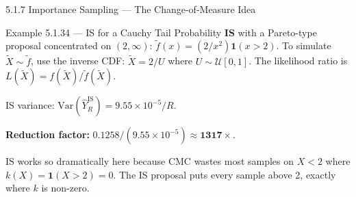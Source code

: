 \documentclass[aspectratio=169,10pt]{beamer}
\begin{document}
\begin{frame}[allowframebreaks]{5.1.7 Importance Sampling --- The Change-of-Measure Idea}
\begin{exampleblock}{Example 5.1.34 --- IS for a Cauchy Tail Probability}
  \medskip
  \textbf{IS} with a Pareto-type proposal concentrated on $(2,\infty)$:
  $\tilde{f}(x) = (2/x^2)\mathbf{1}(x>2)$.
  To simulate $\tilde{X} \sim \tilde{f}$, use the inverse CDF: $\tilde{X} = 2/U$
  where $U \sim \mathcal{U}[0,1]$.  The likelihood ratio is
  $L(\tilde{X}) = f(\tilde{X})/\tilde{f}(\tilde{X})$.

  \medskip
  IS variance: $\mathrm{Var}(\hat{Y}^{\mathrm{IS}}_R) = 9.55\times10^{-5}/R$.

  \medskip
  \textbf{Reduction factor:} $0.1258 / (9.55\times10^{-5}) \approx \mathbf{1317}\times$.

  \medskip
  IS works so dramatically here because CMC wastes most samples on $X < 2$
  where $k(X) = \mathbf{1}(X>2) = 0$.  The IS proposal puts every sample
  above 2, exactly where $k$ is non-zero.
\end{exampleblock}

\end{frame}
\end{document}
